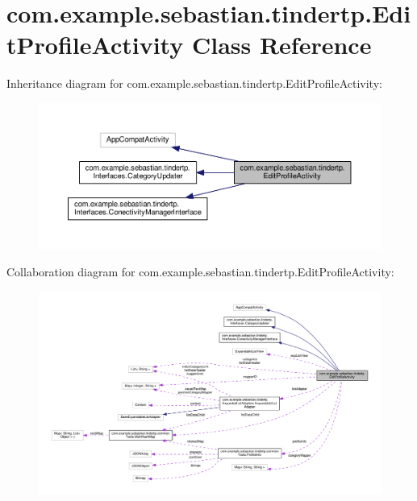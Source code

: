 \hypertarget{classcom_1_1example_1_1sebastian_1_1tindertp_1_1EditProfileActivity}{}\section{com.\+example.\+sebastian.\+tindertp.\+Edit\+Profile\+Activity Class Reference}
\label{classcom_1_1example_1_1sebastian_1_1tindertp_1_1EditProfileActivity}


Inheritance diagram for com.\+example.\+sebastian.\+tindertp.\+Edit\+Profile\+Activity\+:
\nopagebreak
\begin{figure}[H]
\begin{center}
\leavevmode
\includegraphics[width=350pt]{classcom_1_1example_1_1sebastian_1_1tindertp_1_1EditProfileActivity__inherit__graph}
\end{center}
\end{figure}


Collaboration diagram for com.\+example.\+sebastian.\+tindertp.\+Edit\+Profile\+Activity\+:
\nopagebreak
\begin{figure}[H]
\begin{center}
\leavevmode
\includegraphics[width=350pt]{classcom_1_1example_1_1sebastian_1_1tindertp_1_1EditProfileActivity__coll__graph}
\end{center}
\end{figure}
